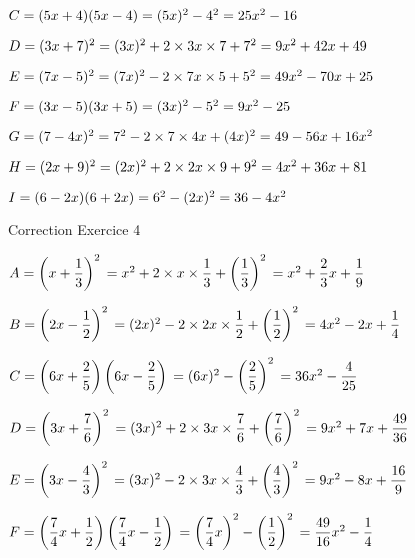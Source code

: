 $C=(5x+4)(5x-4) \\
=(5x)^2-4^2 \\
=25x^2-16
$

$ D=(3x+7)^2 \\
=(3x)^2+2\times 3x \times 7 + 7^2 \\
=9x^2+42x+49
$

$ E=(7x-5)^2 \\
=(7x)^2-2\times 7x \times 5+5^2 \\
=49x^2-70x+25
$

$ F=(3x-5)(3x+5) \\
=(3x)^2-5^2 \\
=9x^2-25
$

$ G=(7-4x)^2 \\
=7^2-2\times 7 \times 4x + (4x)^2 \\
=49-56x+16x^2
$

$ H=(2x+9)^2 \\
=(2x)^2+2\times 2x \times 9 + 9^2 \\
=4x^2+36x+81
$

$ I=(6-2x)(6+2x) \\
=6^2-(2x)^2 \\
=36-4x^2
$

Correction Exercice 4

$ A=\left(x+\dfrac{1}{3}\right)^2 \\
=x^2+2 \times x\times \dfrac{1}{3} + \left(\dfrac{1}{3}\right)^2 \\
=x^2+\dfrac{2}{3}x + \dfrac{1}{9}
$

$ B=\left(2x-\dfrac{1}{2}\right)^2 \\
=(2x)^2-2\times 2x \times \dfrac{1}{2}+\left(\dfrac{1}{2}\right)^2 \\
=4x^2-2x+\dfrac{1}{4}
$

$ C=\left(6x+\dfrac{2}{5}\right)\left(6x-\dfrac{2}{5}\right) \\
=(6x)^2-\left(\dfrac{2}{5}\right)^2 \\
=36x^2-\dfrac{4}{25}
$

$D=\left(3x+\dfrac{7}{6}\right)^2 \\
=(3x)^2+2\times 3x \times \dfrac{7}{6}+\left(\dfrac{7}{6}\right)^2 \\
=9x^2+7x+\dfrac{49}{36}
$

$ E=\left(3x-\dfrac{4}{3}\right)^2 \\
=(3x)^2-2\times 3x \times \dfrac{4}{3}+\left(\dfrac{4}{3}\right)^2 \\
=9x^2-8x+\dfrac{16}{9}
$

$F=\left(\dfrac{7}{4}x+\dfrac{1}{2}\right)\left(\dfrac{7}{4}x-\dfrac{1}{2}\right) \\
=\left(\dfrac{7}{4}x\right)^2-\left(\dfrac{1}{2}\right)^2 \\
=\dfrac{49}{16}x^2-\dfrac{1}{4}
$

